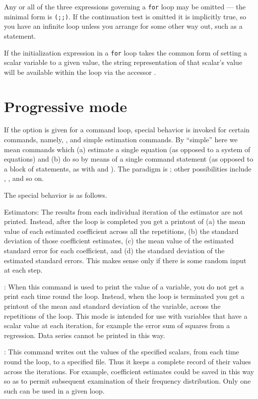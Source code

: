 Any or all of the three expressions governing a \texttt{for} loop may
be omitted --- the minimal form is \texttt{(;;)}.  If the continuation
test is omitted it is implicitly true, so you have an infinite loop
unless you arrange for some other way out, such as a 
statement.

If the initialization expression in a \texttt{for} loop takes the
common form of setting a scalar variable to a given value, the string
representation of that scalar's value will be available within
the loop via the accessor .  


\section{Progressive mode}
\label{loop-progressive}

If the  option is given for a command loop,
special behavior is invoked for certain commands, namely, ,
 and simple estimation commands.  By ``simple'' here we
mean commands which (a) estimate a single equation (as opposed to a
system of equations) and (b) do so by means of a single command
statement (as opposed to a block of statements, as with  and
).  The paradigm is ; other possibilities include
, ,  and so on.

The special behavior is as follows.

Estimators: The results from each individual iteration of the
estimator are not printed.  Instead, after the loop is completed you
get a printout of (a) the mean value of each estimated coefficient
across all the repetitions, (b) the standard deviation of those
coefficient estimates, (c) the mean value of the estimated standard
error for each coefficient, and (d) the standard deviation of the
estimated standard errors.  This makes sense only if there is some
random input at each step.

: When this command is used to print the value of a
variable, you do not get a print each time round the loop.  Instead,
when the loop is terminated you get a printout of the mean and
standard deviation of the variable, across the repetitions of the
loop.  This mode is intended for use with variables that have a scalar
value at each iteration, for example the error sum of squares from a
regression.  Data series cannot be printed in this way.

: This command writes out the values of the specified
scalars, from each time round the loop, to a specified file.  Thus it
keeps a complete record of their values across the iterations.  For
example, coefficient estimates could be saved in this way so as to
permit subsequent examination of their frequency distribution.  Only
one such  can be used in a given loop.

